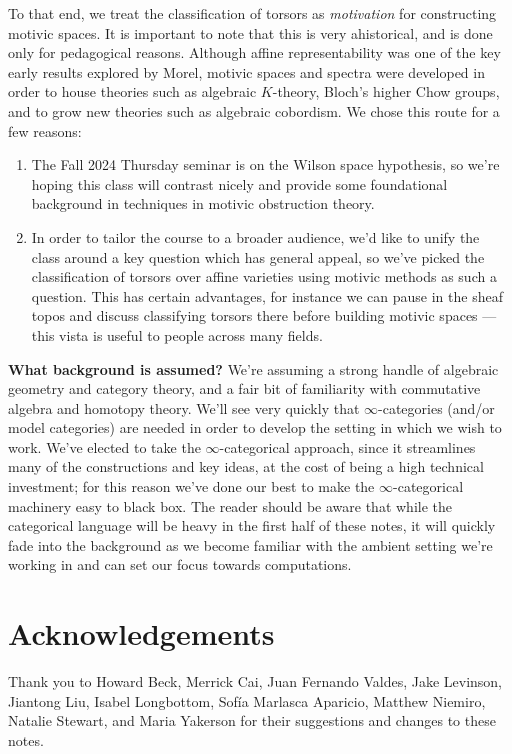 \documentclass[11pt,openany]{book}
\begin{document}
To that end, we treat the classification of torsors as \textit{motivation} for constructing motivic spaces. It is important to note that this is very ahistorical, and is done only for pedagogical reasons. Although affine representability was one of the key early results explored by Morel, motivic spaces and spectra were developed in order to house theories such as algebraic $K$-theory, Bloch's higher Chow groups, and to grow new theories such as algebraic cobordism. We chose this route for a few reasons:
\begin{enumerate}
    \item The Fall 2024 Thursday seminar is on the Wilson space hypothesis, so we're hoping this class will contrast nicely and provide some foundational background in techniques in motivic obstruction theory.
    \item In order to tailor the course to a broader audience, we'd like to unify the class around a key question which has general appeal, so we've picked the classification of torsors over affine varieties using motivic methods as such a question. This has certain advantages, for instance we can pause in the sheaf topos and discuss classifying torsors there before building motivic spaces --- this vista is useful to people across many fields.
\end{enumerate}

\textbf{What background is assumed?} We're assuming a strong handle of algebraic geometry and category theory, and a fair bit of familiarity with commutative algebra and homotopy theory. We'll see very quickly that $\infty$-categories (and/or model categories) are needed in order to develop the setting in which we wish to work. We've elected to take the $\infty$-categorical approach, since it streamlines many of the constructions and key ideas, at the cost of being a high technical investment; for this reason we've done our best to make the $\infty$-categorical machinery easy to black box. The reader should be aware that while the categorical language will be heavy in the first half of these notes, it will quickly fade into the background as we become familiar with the ambient setting we're working in and can set our focus towards computations.




\section*{Acknowledgements}

Thank you to Howard Beck, Merrick Cai, Juan Fernando Valdes, Jake Levinson, Jiantong Liu, Isabel Longbottom, Sof\'ia Marlasca Aparicio, Matthew Niemiro, Natalie Stewart, and Maria Yakerson for their suggestions and changes to these notes.
\end{document}
